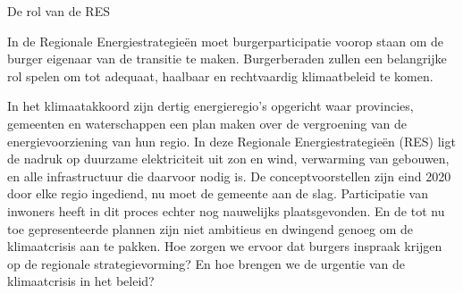 \begin{voorstel}{De rol van de RES}


\begin{samenvatting}
In de Regionale Energiestrategieën moet burgerparticipatie voorop staan om de burger eigenaar van de transitie te maken. Burgerberaden zullen een belangrijke rol spelen om tot adequaat, haalbaar en rechtvaardig klimaatbeleid te komen.
\end{samenvatting}

\begin{multicols*}{2}

\begin{uitdaging}
In het klimaatakkoord zijn dertig energieregio’s opgericht waar provincies, gemeenten en waterschappen een plan maken over de vergroening van de energievoorziening van hun regio. In deze Regionale Energiestrategieën (RES) ligt de nadruk op duurzame elektriciteit uit zon en wind, verwarming van gebouwen, en alle infrastructuur die daarvoor nodig is. De conceptvoorstellen zijn eind 2020 door elke regio ingediend, nu moet de gemeente aan de slag.
Participatie van inwoners heeft in dit proces echter nog nauwelijks plaatsgevonden. En de tot nu toe gepresenteerde plannen zijn niet ambitieus en dwingend genoeg om de klimaatcrisis aan te pakken.
Hoe zorgen we ervoor dat burgers inspraak krijgen op de regionale strategievorming? En hoe brengen we de urgentie van de klimaatcrisis in het beleid?
\end{uitdaging}

\begin{overwegingen}


\end{overwegingen}
\end{multicols*}
\end{voorstel}
